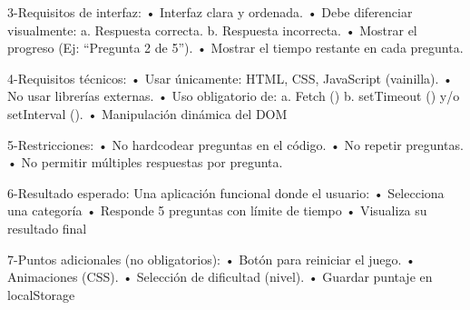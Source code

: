 3-Requisitos de interfaz:
•	Interfaz clara y ordenada.
•	Debe diferenciar visualmente: 
        a.	Respuesta correcta.
        b.	Respuesta incorrecta.
•	Mostrar el progreso (Ej: “Pregunta 2 de 5”).
•	Mostrar el tiempo restante en cada pregunta.

4-Requisitos técnicos:
•	Usar únicamente: HTML, CSS, JavaScript (vainilla).
•	No usar librerías externas.
•	Uso obligatorio de:
        a.	Fetch ()
        b.	setTimeout () y/o setInterval ().
•	Manipulación dinámica del DOM

5-Restricciones:
•	No hardcodear preguntas en el código.
•	No repetir preguntas.
•	No permitir múltiples respuestas por pregunta.

6-Resultado esperado:
Una aplicación funcional donde el usuario:
•	Selecciona una categoría
•	Responde 5 preguntas con límite de tiempo
•	Visualiza su resultado final

7-Puntos adicionales (no obligatorios):
•	Botón para reiniciar el juego.
•	Animaciones (CSS).
•	Selección de dificultad (nivel).
•	Guardar puntaje en localStorage